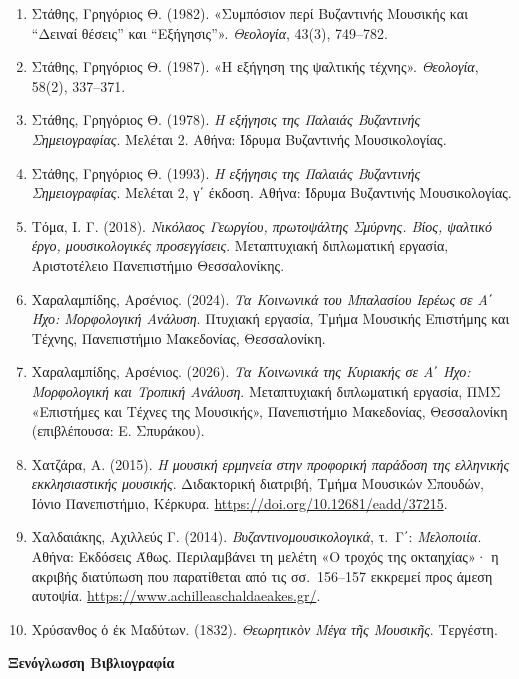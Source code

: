 \documentclass[11pt,a4paper]{article}
\begin{document}
\begin{enumerate}
\item
 Στάθης, Γρηγόριος Θ. (1982). «Συμπόσιον περί Βυζαντινής Μουσικής και ``Δειναί θέσεις'' και ``Εξήγησις''». \emph{Θεολογία}, 43(3), 749--782.
\item
 Στάθης, Γρηγόριος Θ. (1987). «Η εξήγηση της ψαλτικής τέχνης». \emph{Θεολογία}, 58(2), 337--371.
\item
 Στάθης, Γρηγόριος Θ. (1978). \emph{Η εξήγησις της Παλαιάς Βυζαντινής Σημειογραφίας}. Μελέται 2. Αθήνα: Ίδρυμα Βυζαντινής Μουσικολογίας.
\item
 Στάθης, Γρηγόριος Θ. (1993). \emph{Η εξήγησις της Παλαιάς Βυζαντινής Σημειογραφίας}. Μελέται 2, γ΄ έκδοση. Αθήνα: Ίδρυμα Βυζαντινής Μουσικολογίας.
\item
 Τόμα, Ι. Γ. (2018). \emph{Νικόλαος Γεωργίου, πρωτοψάλτης Σμύρνης. Βίος, ψαλτικό έργο, μουσικολογικές προσεγγίσεις}. Μεταπτυχιακή διπλωματική εργασία, Αριστοτέλειο Πανεπιστήμιο Θεσσαλονίκης.
\item
 Χαραλαμπίδης, Αρσένιος. (2024). \emph{Τα Κοινωνικά του Μπαλασίου Ιερέως σε Α΄ Ήχο: Μορφολογική Ανάλυση}. Πτυχιακή εργασία, Τμήμα Μουσικής Επιστήμης και Τέχνης, Πανεπιστήμιο Μακεδονίας, Θεσσαλονίκη.
\item
 Χαραλαμπίδης, Αρσένιος. (2026). \emph{Τα Κοινωνικά της Κυριακής σε Α΄ Ήχο: Μορφολογική και Τροπική Ανάλυση}. Μεταπτυχιακή διπλωματική εργασία, ΠΜΣ «Επιστήμες και Τέχνες της Μουσικής», Πανεπιστήμιο Μακεδονίας, Θεσσαλονίκη (επιβλέπουσα: Ε. Σπυράκου).
\item
 Χατζάρα, Α. (2015). \emph{Η μουσική ερμηνεία στην προφορική παράδοση της ελληνικής εκκλησιαστικής μουσικής}. Διδακτορική διατριβή, Τμήμα Μουσικών Σπουδών, Ιόνιο Πανεπιστήμιο, Κέρκυρα. \url{https://doi.org/10.12681/eadd/37215}.
\item
 Χαλδαιάκης, Αχιλλεύς Γ. (2014). \emph{Βυζαντινομουσικολογικά}, τ.~Γ΄: \emph{Μελοποιία}. Αθήνα: Εκδόσεις Άθως. Περιλαμβάνει τη μελέτη «Ο τροχός της οκταηχίας»· η ακριβής διατύπωση που παρατίθεται από τις σσ.~156--157 εκκρεμεί προς άμεση αυτοψία. \url{https://www.achilleaschaldaeakes.gr/}.
\item
 Χρύσανθος ὁ ἐκ Μαδύτων. (1832). \emph{Θεωρητικὸν Μέγα τῆς Μουσικῆς}. Τεργέστη.
\end{enumerate}

\textbf{Ξενόγλωσση Βιβλιογραφία}
\end{document}
